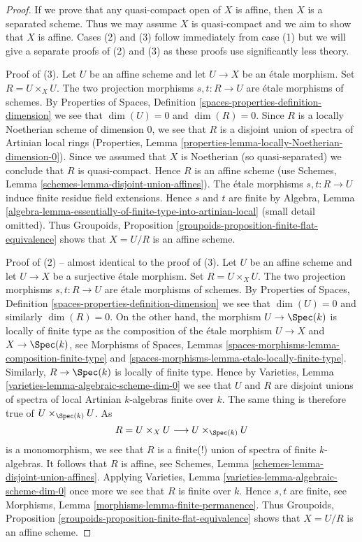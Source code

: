\begin{proof}
If we prove that any quasi-compact open of $X$ is affine, then
$X$ is a separated scheme. Thus we may assume $X$ is quasi-compact
and we aim to show that $X$ is affine.
Cases (2) and (3) follow immediately from case (1) but we will give a separate
proofs of (2) and (3) as these proofs use significantly less theory.

\medskip\noindent
Proof of (3). Let $U$ be an affine scheme and let $U \to X$ be an
\'etale morphism. Set $R = U \times_X U$. The two projection
morphisms $s, t : R \to U$ are \'etale morphisms of schemes. By
Properties of Spaces, Definition \ref{spaces-properties-definition-dimension}
we see that $\dim(U) = 0$ and $\dim(R) = 0$.
Since $R$ is a locally Noetherian scheme of dimension $0$,
we see that $R$ is a disjoint union of spectra of
Artinian local rings
(Properties, Lemma \ref{properties-lemma-locally-Noetherian-dimension-0}).
Since we assumed that $X$ is Noetherian (so quasi-separated) we
conclude that $R$ is quasi-compact. Hence $R$ is an affine scheme
(use Schemes, Lemma \ref{schemes-lemma-disjoint-union-affines}).
The \'etale morphisms $s, t : R \to U$ induce finite residue field
extensions. Hence $s$ and $t$ are finite by
Algebra, Lemma
\ref{algebra-lemma-essentially-of-finite-type-into-artinian-local}
(small detail omitted). 
Thus
Groupoids, Proposition \ref{groupoids-proposition-finite-flat-equivalence}
shows that $X = U/R$ is an affine scheme.

\medskip\noindent
Proof of (2) -- almost identical to the proof of (3).
Let $U$ be an affine scheme and let $U \to X$ be a surjective \'etale morphism.
Set $R = U \times_X U$. The two projection morphisms
$s, t : R \to U$ are \'etale morphisms of schemes. By
Properties of Spaces, Definition \ref{spaces-properties-definition-dimension}
we see that $\dim(U) = 0$ and similarly $\dim(R) = 0$.
On the other hand, the morphism $U \to \Spec(k)$ is locally of finite
type as the composition of the \'etale morphism $U \to X$ and
$X \to \Spec(k)$, see
Morphisms of Spaces,
Lemmas \ref{spaces-morphisms-lemma-composition-finite-type} and
\ref{spaces-morphisms-lemma-etale-locally-finite-type}.
Similarly, $R \to \Spec(k)$ is locally of finite type.
Hence by
Varieties, Lemma \ref{varieties-lemma-algebraic-scheme-dim-0}
we see that $U$ and $R$ are disjoint unions of spectra of
local Artinian $k$-algebras finite over $k$. The same thing
is therefore true of $U \times_{\Spec(k)} U$. As
$$
R = U \times_X U \longrightarrow U \times_{\Spec(k)} U
$$
is a monomorphism, we see that $R$ is a finite(!) union of spectra of
finite $k$-algebras. It follows that $R$ is affine, see
Schemes, Lemma \ref{schemes-lemma-disjoint-union-affines}.
Applying
Varieties, Lemma \ref{varieties-lemma-algebraic-scheme-dim-0}
once more we see that $R$ is finite over $k$. Hence $s, t$
are finite, see
Morphisms, Lemma \ref{morphisms-lemma-finite-permanence}.
Thus
Groupoids, Proposition \ref{groupoids-proposition-finite-flat-equivalence}
shows that $X = U/R$ is an affine scheme.


\end{proof}
